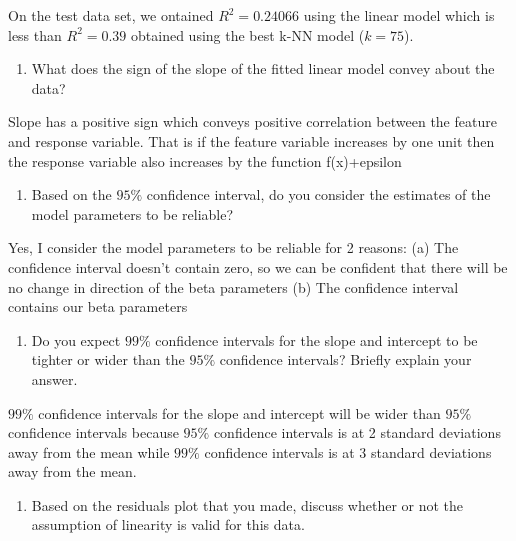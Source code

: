 \documentclass[11pt]{article}
\providecommand{\tightlist}{%
      \setlength{\itemsep}{0pt}\setlength{\parskip}{0pt}}
\begin{document}
On the test data set, we ontained \(R^2 = 0.24066\) using the linear
model which is less than \(R^2 = 0.39\) obtained using the best k-NN
model (\(k=75\)).

\begin{enumerate}
\def\labelenumi{\arabic{enumi}.}
\setcounter{enumi}{1}
\tightlist
\item
  What does the sign of the slope of the fitted linear model convey
  about the data?
\end{enumerate}

Slope has a positive sign which conveys positive correlation between the
feature and response variable. That is if the feature variable increases
by one unit then the response variable also increases by the function
f(x)+epsilon

\begin{enumerate}
\def\labelenumi{\arabic{enumi}.}
\setcounter{enumi}{2}
\tightlist
\item
  Based on the \(95\%\) confidence interval, do you consider the
  estimates of the model parameters to be reliable?
\end{enumerate}

Yes, I consider the model parameters to be reliable for 2 reasons: (a)
The confidence interval doesn't contain zero, so we can be confident
that there will be no change in direction of the beta parameters (b) The
confidence interval contains our beta parameters

\begin{enumerate}
\def\labelenumi{\arabic{enumi}.}
\setcounter{enumi}{3}
\tightlist
\item
  Do you expect \(99\%\) confidence intervals for the slope and
  intercept to be tighter or wider than the \(95\%\) confidence
  intervals? Briefly explain your answer.
\end{enumerate}

\(99\%\) confidence intervals for the slope and intercept will be wider
than \(95\%\) confidence intervals because \(95\%\) confidence intervals
is at 2 standard deviations away from the mean while \(99\%\) confidence
intervals is at 3 standard deviations away from the mean.

\begin{enumerate}
\def\labelenumi{\arabic{enumi}.}
\setcounter{enumi}{4}
\tightlist
\item
  Based on the residuals plot that you made, discuss whether or not the
  assumption of linearity is valid for this data.
\end{enumerate}
\end{document}
